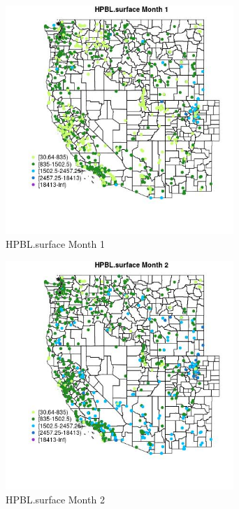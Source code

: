 \begin{figure} 
\centering  
\includegraphics[width=0.77\textwidth]{Code_Outputs/Report_ML_input_PM25_Step4_part_f_de_duplicated_aveswNAs_MapObsMo1HPBLsurface.jpg} 
\caption{\label{fig:Report_ML_input_PM25_Step4_part_f_de_duplicated_aveswNAsMapObsMo1HPBLsurface}HPBL.surface Month 1} 
\end{figure} 
 

\begin{figure} 
\centering  
\includegraphics[width=0.77\textwidth]{Code_Outputs/Report_ML_input_PM25_Step4_part_f_de_duplicated_aveswNAs_MapObsMo2HPBLsurface.jpg} 
\caption{\label{fig:Report_ML_input_PM25_Step4_part_f_de_duplicated_aveswNAsMapObsMo2HPBLsurface}HPBL.surface Month 2} 
\end{figure} 
 

